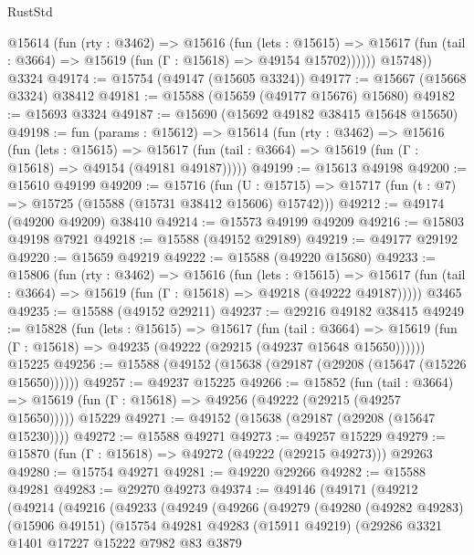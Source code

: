 \begin{lexlean}{RustStd}
\begin{coremodule}
          @15614
            (fun (rty : @3462) =>
            @15616
              (fun (lets : @15615) =>
              @15617 (fun (tail : @3664) => @15619 (fun (Γ : @15618) => @49154 @15702))))))
        @15748))
    @3324
@49174 := @15754 (@49147 (@15605 @3324))
@49177 := @15667 (@15668 @3324) @38412
@49181 := @15588 (@15659 (@49177 @15676) @15680)
@49182 := @15693 @3324
@49187 := @15690 (@15692 @49182 @38415 @15648 @15650)
@49198 := fun (params : @15612) =>
  @15614
    (fun (rty : @3462) =>
    @15616
      (fun (lets : @15615) =>
      @15617 (fun (tail : @3664) => @15619 (fun (Γ : @15618) => @49154 (@49181 @49187)))))
@49199 := @15613 @49198
@49200 := @15610 @49199
@49209 := @15716
    (fun (U : @15715) => @15717 (fun (t : @7) => @15725 (@15588 (@15731 @38412 @15606) @15742)))
@49212 := @49174 (@49200 @49209) @38410
@49214 := @15573 @49199 @49209
@49216 := @15803 @49198 @7921
@49218 := @15588 (@49152 @29189)
@49219 := @49177 @29192
@49220 := @15659 @49219
@49222 := @15588 (@49220 @15680)
@49233 := @15806
    (fun (rty : @3462) =>
    @15616
      (fun (lets : @15615) =>
      @15617 (fun (tail : @3664) => @15619 (fun (Γ : @15618) => @49218 (@49222 @49187)))))
    @3465
@49235 := @15588 (@49152 @29211)
@49237 := @29216 @49182 @38415
@49249 := @15828
    (fun (lets : @15615) =>
    @15617
      (fun (tail : @3664) =>
      @15619 (fun (Γ : @15618) => @49235 (@49222 (@29215 (@49237 @15648 @15650))))))
    @15225
@49256 := @15588 (@49152 (@15638 (@29187 (@29208 (@15647 (@15226 @15650))))))
@49257 := @49237 @15225
@49266 := @15852
    (fun (tail : @3664) => @15619 (fun (Γ : @15618) => @49256 (@49222 (@29215 (@49257 @15650)))))
    @15229
@49271 := @49152 (@15638 (@29187 (@29208 (@15647 @15230))))
@49272 := @15588 @49271
@49273 := @49257 @15229
@49279 := @15870 (fun (Γ : @15618) => @49272 (@49222 (@29215 @49273))) @29263
@49280 := @15754 @49271
@49281 := @49220 @29266
@49282 := @15588 @49281
@49283 := @29270 @49273
@49374 := @49146
    (@49171
      (@49212
        (@49214
          (@49216
            (@49233
              (@49249
                (@49266
                  (@49279
                    (@49280
                      (@49282 @49283)
                      (@15906 @49151)
                      (@15754
                        @49281
                        @49283
                        (@15911 @49219)
                        (@29286
                          @3321
                          @1401
                          @17227
                          @15222
                          @7982
                          @83
                          @3879

\end{coremodule}
\end{lexlean}
